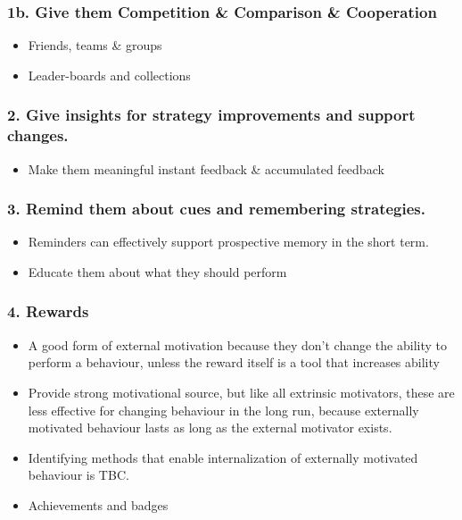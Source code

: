 \subsubsection*{1b. Give them Competition \& Comparison \& Cooperation}
  \begin{itemize}
    \item Friends, teams \& groups
    \item Leader-boards and collections
  \end{itemize}

\subsubsection*{2. Give insights for strategy improvements and support changes.}
  \begin{itemize}
    \item Make them meaningful instant feedback \& accumulated feedback
  \end{itemize}

\subsubsection*{3. Remind them about cues and remembering strategies.}
  \begin{itemize}
    \item Reminders can effectively support prospective memory in the short term.
    \item Educate them about what they should perform
  \end{itemize}

\subsubsection*{4. Rewards}
  \begin{itemize}
    \item A good form of external motivation because they don't change the ability to perform a behaviour, unless the reward itself is a tool that increases ability
    \item Provide strong motivational source, but like all extrinsic motivators, these are less effective for changing behaviour in the long run, because externally motivated behaviour lasts as long as the external motivator exists.
    \item Identifying methods that enable internalization of externally motivated behaviour is TBC.
    \item Achievements and badges
  \end{itemize}

